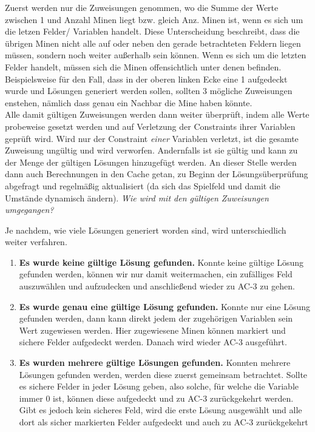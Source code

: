 Zuerst werden nur die Zuweisungen genommen, wo die Summe der Werte zwischen 1 und Anzahl Minen liegt bzw. gleich Anz. Minen ist, wenn es
sich um die letzen Felder/ Variablen handelt. Diese Unterscheidung beschreibt, dass die übrigen Minen nicht alle auf oder neben den gerade
betrachteten Feldern liegen müssen, sondern noch weiter außerhalb sein können. Wenn es sich um die letzten Felder handelt, müssen sich die
Minen offensichtlich unter denen befinden. Beispielsweise für den Fall, dass in der oberen linken Ecke eine 1 aufgedeckt wurde und Lösungen
generiert werden sollen, sollten 3 mögliche Zuweisungen enstehen, nämlich dass genau ein Nachbar die Mine haben könnte.\\
Alle damit gültigen Zuweisungen werden dann weiter überprüft, indem alle Werte probeweise gesetzt werden und auf Verletzung der Constraints
ihrer Variablen geprüft wird. Wird nur der Constraint \textit{einer} Variablen verletzt, ist die gesamte Zuweisung ungültig und wird verworfen.
Andernfalls ist sie gültig und kann zu der Menge der gültigen Lösungen hinzugefügt werden. An dieser Stelle werden dann auch Berechnungen
in den Cache getan, zu Beginn der Lösungsüberprüfung abgefragt und regelmäßig aktualisiert (da sich das Spielfeld und damit die Umstände
dynamisch ändern).
\clearpage
\textit{Wie wird mit den gültigen Zuweisungen umgegangen?}

Je nachdem, wie viele Lösungen generiert worden sind, wird unterschiedlich weiter verfahren.
\begin{enumerate}
    \item \textbf{Es wurde keine gültige Lösung gefunden.} Konnte keine gültige Lösung gefunden werden, können wir nur damit weitermachen,
    ein zufälliges Feld auszuwählen und aufzudecken und anschließend wieder zu AC-3 zu gehen.
    \item \textbf{Es wurde genau eine gültige Lösung gefunden.} Konnte nur eine Lösung gefunden werden, dann kann direkt jedem der zugehörigen
    Variablen sein Wert zugewiesen werden. Hier zugewiesene Minen können markiert und sichere Felder aufgedeckt werden. Danach wird wieder
    AC-3 ausgeführt. 
    \item \textbf{Es wurden mehrere gültige Lösungen gefunden.} Konnten mehrere Lösungen gefunden werden, werden diese zuerst gemeinsam betrachtet.
    Sollte es sichere Felder in jeder Lösung geben, also solche, für welche die Variable immer 0 ist, können diese aufgedeckt und zu AC-3
    zurückgekehrt werden. Gibt es jedoch kein sicheres Feld, wird die erste Lösung ausgewählt und alle dort als sicher markierten Felder
    aufgedeckt und auch zu AC-3 zurückgekehrt
\end{enumerate}

